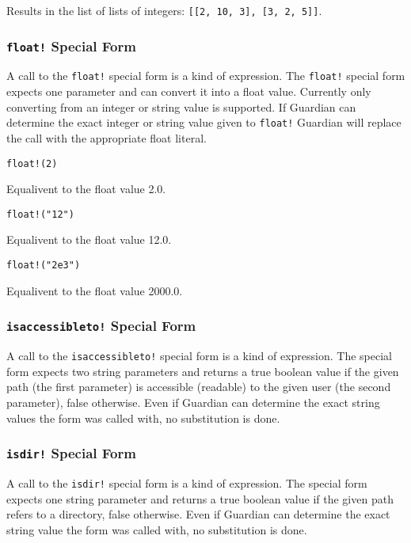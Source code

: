{{\begin{itemize}
{				Results in the list of lists of
				integers: \lstinline[language=MAIA, columns=fixed]@[[2, 10, 3], [3, 2, 5]]@.
		}
		\end{itemize}
	}
	
	\subsubsection{\lstinline[language=MAIA, columns=fixed]@float!@ Special Form}
	{
		A call to the \lstinline[language=MAIA, columns=fixed]@float!@ special form is a kind of expression.
		The \lstinline[language=MAIA, columns=fixed]@float!@ special form expects
		one parameter and can convert it
		into a float value. Currently only converting from an integer or string
		value is supported.
		If Guardian can determine the exact integer or string value given to
		\lstinline[language=MAIA, columns=fixed]@float!@ Guardian will replace the call with the appropriate
		float literal.
		
		\begin{itemize}
		{
			\item[] \lstinline[language=MAIA, columns=fixed]@float!(2)@
			
				Equalivent to the float value 2.0.
			
			\item[] \lstinline[language=MAIA, columns=fixed]@float!("12")@
			
				Equalivent to the float value 12.0.
			
			\item[] \lstinline[language=MAIA, columns=fixed]@float!("2e3")@
			
				Equalivent to the float value 2000.0.
		}
		\end{itemize}
	}
	
	\subsubsection{\lstinline[language=MAIA, columns=fixed]@isaccessibleto!@ Special Form}
	{
		A call to the \lstinline[language=MAIA, columns=fixed]@isaccessibleto!@ special form
		is a kind of expression.
		The special form expects two string parameters and returns a true boolean
		value if the given path (the first parameter) is accessible (readable) to
		the given user (the second parameter), false
		otherwise.
		Even if Guardian can determine the exact string values the form was
		called with, no substitution is done.
	}
	
	\subsubsection{\lstinline[language=MAIA, columns=fixed]@isdir!@ Special Form}
	{
		A call to the \lstinline[language=MAIA, columns=fixed]@isdir!@ special form is a kind of expression.
		The special form expects one string parameter and returns a true boolean
		value if the given path refers to a directory, false
		otherwise.
		Even if Guardian can determine the exact string value the form was
		called with, no substitution is done.
	}
	
}

